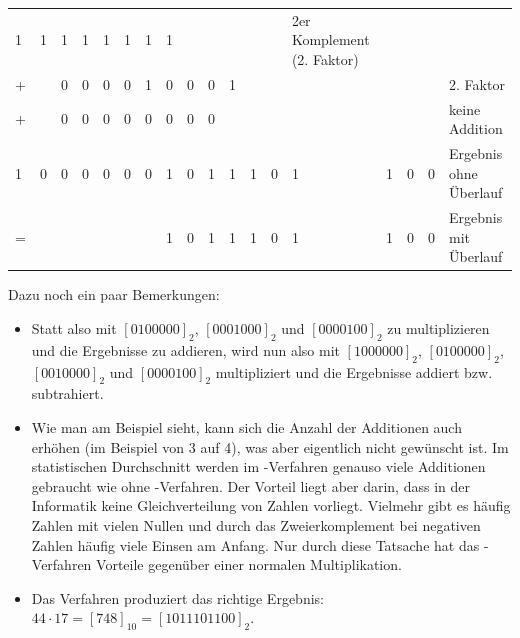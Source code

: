 \begin{tabularx}{\textwidth}{XXXXXXXXXXXXXXXXX|p{3.2cm}}
	1 &
	1 &
	1 &
	1 & 
	1 &
	1 &
	1 &
	1 &
	\cellcolor{lightgray} &
	\cellcolor{lightgray} &
	\cellcolor{lightgray} &
	\cellcolor{lightgray} &
	\cellcolor{lightgray} &
	\tiny 2er Komplement (2. Faktor) \\
	+ &
	&
	\cellcolor{lightgray} 0&
	0 &
	0 &
	0 &
	1 &
	0 & 
	0 &
	0 &
	1 &
	\cellcolor{lightgray} &
	\cellcolor{lightgray} &
	\cellcolor{lightgray} &
	\cellcolor{lightgray} &
	\cellcolor{lightgray} &
	\cellcolor{lightgray} &
	\tiny 2. Faktor \\
	+ &
	&
	0 &
	0 &
	0 &
	0 &
	0 &
	0 & 
	0 &
	0 &
	\cellcolor{lightgray} &
	\cellcolor{lightgray} &
	\cellcolor{lightgray} &
	\cellcolor{lightgray} &
	\cellcolor{lightgray} &
	\cellcolor{lightgray} &
	\cellcolor{lightgray} &
	\tiny keine Addition \\
	\hline
	\cellcolor{lightgray} 1 &
	\cellcolor{lightgray} 0&
	\cellcolor{gray} 0 &
	\cellcolor{gray} 0 &
	\cellcolor{gray} 0 &
	\cellcolor{gray} 0 &
	\cellcolor{gray} 0 &
	\cellcolor{gray} 1 & 
	\cellcolor{gray} 0 &
	\cellcolor{gray} 1 &
	\cellcolor{gray} 1 &
	\cellcolor{gray} 1 &
	\cellcolor{gray} 0 &
	\cellcolor{gray} 1 &
	\cellcolor{gray} 1 &
	\cellcolor{gray} 0 &
	\cellcolor{gray} 0 &
	\tiny Ergebnis ohne Überlauf \\
	\hline
	= &
	 &
	\cellcolor{gray} &
	\cellcolor{gray} &
	\cellcolor{gray} &
	\cellcolor{gray} &
	\cellcolor{gray} &
	\cellcolor{gray} 1 & 
	\cellcolor{gray} 0 &
	\cellcolor{gray} 1 &
	\cellcolor{gray} 1 &
	\cellcolor{gray} 1 &
	\cellcolor{gray} 0 &
	\cellcolor{gray} 1 &
	\cellcolor{gray} 1 &
	\cellcolor{gray} 0 &
	\cellcolor{gray} 0 &
	\tiny Ergebnis mit Überlauf \\
\end{tabularx}

Dazu noch ein paar Bemerkungen:
\begin{itemize}
	\item Statt also mit $[0100000]_2$, $[0001000]_2$ und $[0000100]_2$ zu multiplizieren und die Ergebnisse zu addieren, wird nun also mit $[1000000]_2$, $[0100000]_2$, $[0010000]_2$ und $[0000100]_2$ multipliziert und die Ergebnisse addiert bzw. subtrahiert.
	\item Wie man am Beispiel sieht, kann sich die Anzahl der Additionen auch erhöhen (im Beispiel von 3 auf 4), was aber eigentlich nicht gewünscht ist. Im statistischen Durchschnitt werden im -Verfahren genauso viele Additionen gebraucht wie ohne -Verfahren. Der Vorteil liegt aber darin, dass in der Informatik keine Gleichverteilung von Zahlen vorliegt. Vielmehr gibt es häufig Zahlen mit vielen Nullen und durch das Zweierkomplement bei negativen Zahlen häufig viele Einsen am Anfang. Nur durch diese Tatsache hat das -Verfahren Vorteile gegenüber einer normalen Multiplikation.
	\item Das Verfahren produziert das richtige Ergebnis: $44\cdot 17=[748]_{10}=[1011101100]_2$.
\end{itemize}

